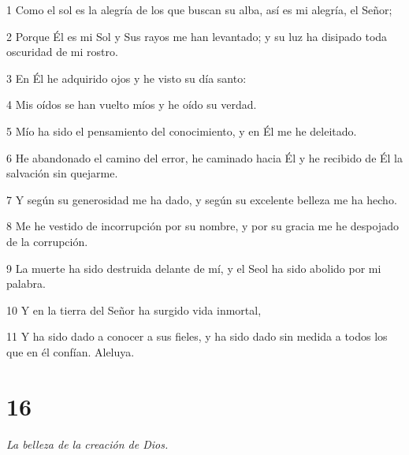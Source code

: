 \par 1 Como el sol es la alegría de los que buscan su alba, así es mi alegría, el Señor;
\par 2 Porque Él es mi Sol y Sus rayos me han levantado; y su luz ha disipado toda oscuridad de mi rostro.
\par 3 En Él he adquirido ojos y he visto su día santo:
\par 4 Mis oídos se han vuelto míos y he oído su verdad.
\par 5 Mío ha sido el pensamiento del conocimiento, y en Él me he deleitado.
\par 6 He abandonado el camino del error, he caminado hacia Él y he recibido de Él la salvación sin quejarme.
\par 7 Y según su generosidad me ha dado, y según su excelente belleza me ha hecho.
\par 8 Me he vestido de incorrupción por su nombre, y por su gracia me he despojado de la corrupción.
\par 9 La muerte ha sido destruida delante de mí, y el Seol ha sido abolido por mi palabra.
\par 10 Y en la tierra del Señor ha surgido vida inmortal,
\par 11 Y ha sido dado a conocer a sus fieles, y ha sido dado sin medida a todos los que en él confían. Aleluya.

\chapter{16}

\par \textit{La belleza de la creación de Dios.}

